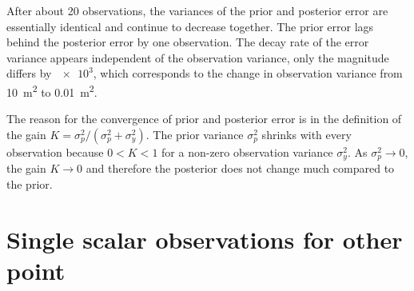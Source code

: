 \documentclass[parskip=half,DIV=16]{scrartcl}
\begin{document}
After about 20 observations, the variances of the prior and posterior error are essentially identical and continue to decrease together. The prior error lags behind the posterior error by one observation. The decay rate of the error variance appears independent of the observation variance, only the magnitude differs by $\num{e3}$, which corresponds to the change in observation variance from \qty{10}{m^2} to \qty{0.01}{m^2}.

The reason for the convergence of prior and posterior error is in the definition of the gain $K = \sigma_p^2 / (\sigma_p^2 + \sigma_y^2)$. The prior variance $\sigma_p^2$ shrinks with every observation because $0 < K < 1$ for a non-zero observation variance $\sigma_y^2$. As $\sigma_p^2 \to 0$, the gain $K \to 0$ and therefore the posterior does not change much compared to the prior.



\section{Single scalar observations for other point}
\end{document}
